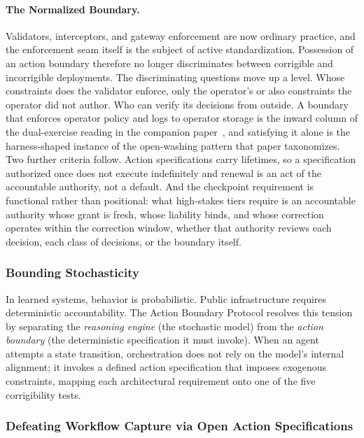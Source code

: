 \documentclass{article}
\theoremstyle{definition}
\begin{document}
\paragraph{The Normalized Boundary.} Validators, interceptors, and gateway enforcement are now ordinary practice, and the enforcement seam itself is the subject of active standardization. Possession of an action boundary therefore no longer discriminates between corrigible and incorrigible deployments. The discriminating questions move up a level. Whose constraints does the validator enforce, only the operator's or also constraints the operator did not author. Who can verify its decisions from outside. A boundary that enforces operator policy and logs to operator storage is the inward column of the dual-exercise reading in the companion paper~\citep{aravind2026dpi}, and satisfying it alone is the harness-shaped instance of the open-washing pattern that paper taxonomizes. Two further criteria follow. Action specifications carry lifetimes, so a specification authorized once does not execute indefinitely and renewal is an act of the accountable authority, not a default. And the checkpoint requirement is functional rather than positional: what high-stakes tiers require is an accountable authority whose grant is fresh, whose liability binds, and whose correction operates within the correction window, whether that authority reviews each decision, each class of decisions, or the boundary itself.

\subsubsection{Bounding Stochasticity}

In learned systems, behavior is probabilistic. Public infrastructure requires deterministic accountability. The Action Boundary Protocol resolves this tension by separating the \textit{reasoning engine} (the stochastic model) from the \textit{action boundary} (the deterministic specification it must invoke). When an agent attempts a state transition, orchestration does not rely on the model's internal alignment; it invokes a defined action specification that imposes exogenous constraints, mapping each architectural requirement onto one of the five corrigibility tests.

\subsubsection{Defeating Workflow Capture via Open Action Specifications}
\end{document}

